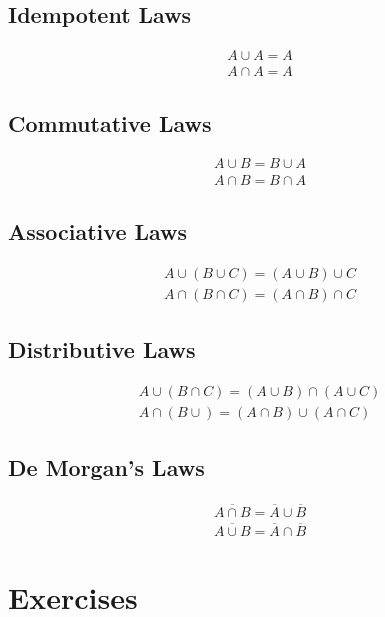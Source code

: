 \documentclass[12pt letter]{report}
\begin{document}
\subsection{Idempotent Laws}

\begin{align*}
	A \cup A = A \\
	A \cap A = A
\end{align*}

\subsection{Commutative Laws}

\begin{align*}
	A \cup B = B \cup A \\
	A \cap B = B \cap A
\end{align*}

\subsection{Associative Laws}

\begin{align*}
	A \cup \left( B \cup  C \right)  = \left( A \cup B \right)  \cup C \\
	A \cap \left( B \cap C  \right)  = \left( A \cap B \right)  \cap C
\end{align*}

\subsection{Distributive Laws}

\begin{align*}
	A \cup \left( B \cap C \right)  = \left( A \cup B \right)  \cap \left( A \cup C \right) \\
	A \cap \left( B \cup  \right)  = \left( A \cap B \right)  \cup \left( A \cap C \right)
\end{align*}

\subsection{De Morgan's Laws}
\begin{align*}
	\overline{A \cap  B} = \overline{A} \cup \overline{B} \\
	\overline{A \cup B } = \overline{A} \cap \overline{B}
\end{align*}

\section{Exercises}
\end{document}
